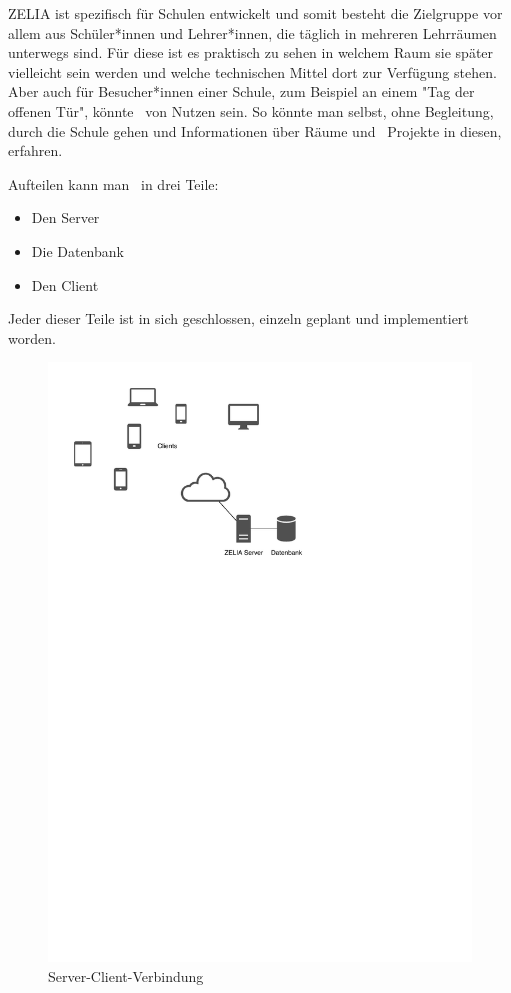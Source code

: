 ZELIA ist spezifisch für Schulen entwickelt und somit besteht die Zielgruppe vor allem aus Schüler*innen und Lehrer*innen, die täglich in mehreren Lehrräumen unterwegs sind. Für diese ist es praktisch zu sehen in welchem Raum sie später vielleicht sein werden und welche technischen Mittel dort zur Verfügung stehen. Aber auch für Besucher*innen einer Schule, zum Beispiel an einem "Tag der offenen Tür", könnte \ZELIA\ von Nutzen sein. So könnte man selbst, ohne Begleitung, durch die Schule gehen und Informationen über Räume und \zb\ Projekte in diesen, erfahren.

\begin{minipage}{\textwidth}
    Aufteilen kann man \ZELIA\ in drei Teile: 
    \begin{itemize}
        \item Den Server
        \item Die Datenbank
        \item Den Client
    \end{itemize}
    Jeder dieser Teile ist in sich geschlossen, einzeln geplant und implementiert worden.
\end{minipage}

\begin{figure}[H]
    \centering
    \includegraphics[width=120mm]{./media/Intro/client_server_arch.svg.pdf}
    \caption{Server-Client-Verbindung}
\end{figure}

